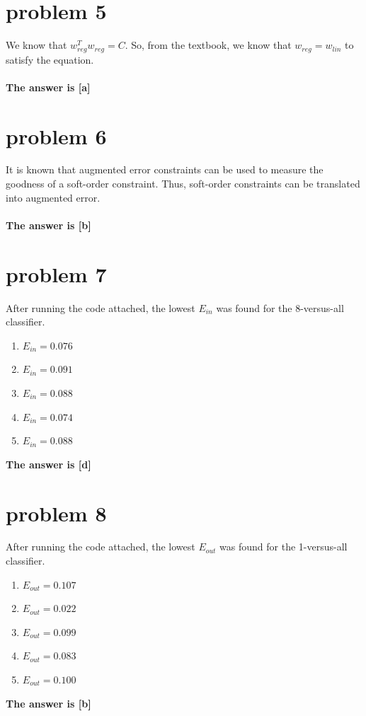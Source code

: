 \documentclass{article}
\begin{document}
\section*{problem 5}
We know that $w_{reg}^Tw_{reg} = C$. So, from the textbook, we know that $w_{reg} = w_{lin}$ to satisfy the equation.\\\\
\textbf{The answer is [a]}

\section*{problem 6}
It is known that augmented error constraints can be used to measure the goodness of a soft-order constraint. Thus, soft-order constraints can be translated into augmented error.\\\\
\textbf{The answer is [b]}

\section*{problem 7}
After running the code attached, the lowest $E_{in}$ was found for the 8-versus-all classifier.
\begin{enumerate}[label=(\alph*)]
    \item $E_{in} = 0.076$
    \item $E_{in} = 0.091$
    \item $E_{in} = 0.088$
    \item $E_{in} = 0.074$
    \item $E_{in} = 0.088$
\end{enumerate}
\textbf{The answer is [d]}

\section*{problem 8} 
After running the code attached, the lowest $E_{out}$ was found for the 1-versus-all classifier.
\begin{enumerate}[label=(\alph*)]
    \item $E_{out} = 0.107$
    \item $E_{out} = 0.022$
    \item $E_{out} = 0.099$
    \item $E_{out} = 0.083$
    \item $E_{out} = 0.100$
\end{enumerate}
\textbf{The answer is [b]}
\end{document}
